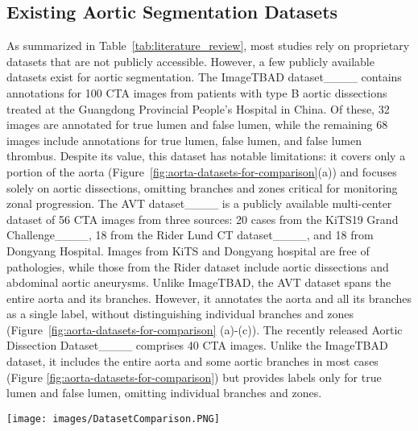 \subsection{Existing Aortic Segmentation Datasets}
\label{sect:about-the-dataset}
As summarized in Table~\ref{tab:literature_review}, most studies rely on proprietary datasets that are not publicly accessible. However, a few publicly available datasets exist for aortic segmentation. The ImageTBAD dataset____ contains annotations for 100 CTA images from patients with type B aortic dissections treated at the Guangdong Provincial People’s Hospital in China. Of these, 32 images are annotated for true lumen and false lumen, while the remaining 68 images include annotations for true lumen, false lumen, and false lumen thrombus.  Despite its value, this dataset has notable limitations: it covers only a portion of the aorta (Figure~\ref{fig:aorta-datasets-for-comparison}(a)) and focuses solely on aortic dissections, omitting branches and zones critical for monitoring zonal progression. The AVT dataset____ is a publicly available multi-center dataset of 56 CTA images from three sources: 20 cases from the KiTS19 Grand Challenge____, 18 from the Rider Lund CT dataset____, and 18 from Dongyang Hospital. Images from KiTS and Dongyang hospital are free of pathologies, while those from the Rider dataset include aortic dissections and abdominal aortic aneurysms. Unlike ImageTBAD, the AVT dataset spans the entire aorta and its branches. However, it annotates the aorta and all its branches as a single label, without distinguishing individual branches and zones (Figure~\ref{fig:aorta-datasets-for-comparison} (a)-(c)). The recently released Aortic Dissection Dataset____ comprises 40 CTA images. Unlike the ImageTBAD dataset, it includes the entire aorta and some aortic branches in most cases (Figure \ref{fig:aorta-datasets-for-comparison}) but provides labels only for true lumen and false lumen, omitting individual branches and zones.

\begin{figure*}[!hbt]%
\centering
\texttt{[image: images/DatasetComparison.PNG]}
\caption{Comparison of various publicly available aortic segmentation datasets}
\label{fig:aorta-datasets-for-comparison}%
\end{figure*}

